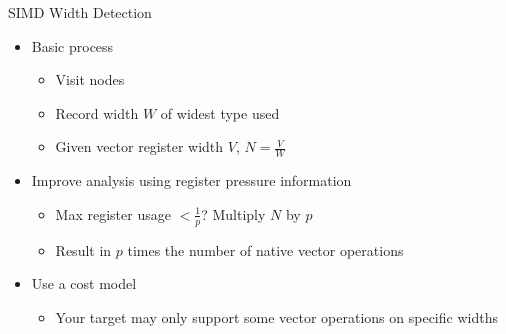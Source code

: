 
\begin{frame}{SIMD Width Detection}

\begin{itemize}
    \item Basic process
    \begin{itemize}
        \item Visit  nodes
        \item Record width $W$ of widest type used
        \item Given vector register width $V$, $N = \frac{V}{W}$
    \end{itemize}
    \item Improve analysis using register pressure information
    \begin{itemize}
        \item Max register usage $< \frac{1}{p}$? Multiply $N$ by $p$
        \item Result in $p$ times the number of native vector operations
    \end{itemize}
    \item Use a cost model
    \begin{itemize}
        \item Your target may only support some vector operations on specific widths
    \end{itemize}
\end{itemize}

\end{frame}


